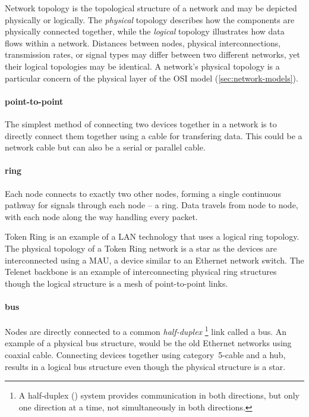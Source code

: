 Network topology is the topological structure of a network and may be depicted physically or logically.
The \emph{physical} topology describes how the components are physically connected together, while the \emph{logical} topology illustrates how data flows within a network.
Distances between nodes, physical interconnections, transmission rates, or signal types may differ between two different networks, yet their logical topologies may be identical.
A network's physical topology is a particular concern of the physical layer of the \gls{OSI} model (\vref{sec:network-models}).



\paragraph{point-to-point}
The simplest method of connecting two devices together in a network is to directly connect them together using a cable for transfering data.
This could be a network cable but can also be a serial or parallel cable.


\paragraph{ring}
Each node connects to exactly two other nodes, forming a single continuous pathway for signals through each node -- a ring.
Data travels from node to node, with each node along the way handling every packet.

Token Ring is an example of a \gls{LAN} technology that uses a logical ring topology.
The physical topology of a Token Ring network is a star as the devices are interconnected using a \ac{MAU}, a device similar to an Ethernet network switch.
The Telenet backbone is an example of interconnecting physical ring structures though the logical structure is a mesh of point-to-point links.


\paragraph{bus}

Nodes are directly connected to a common \emph{half-duplex}%
\footnote{A half-duplex () system provides communication in both directions, but only one direction at a time, not simultaneously in both directions.}
link called a bus.
An example of a physical bus structure, would be the old Ethernet networks using coaxial cable.
Connecting devices together using category~5-cable and a hub, results in a logical bus structure even though the physical structure is a star.

